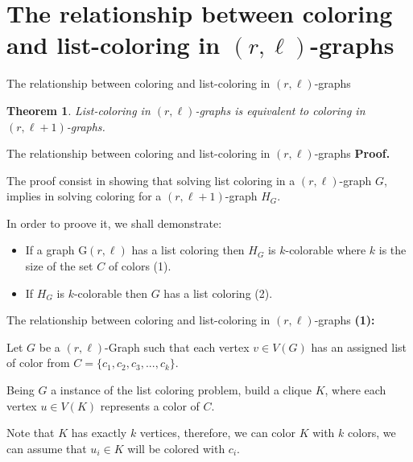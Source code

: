 \documentclass[9pt, compress]{beamer}
\newtheorem{teorema}{Theorem}
\newcommand{\?}{\textcolor{warn}{\textit{?}}}
\begin{document}
    \section{The relationship between coloring and list-coloring in $(r,\ell)$-graphs}
    \begin{frame}{The relationship between coloring and list-coloring in $(r,\ell)$-graphs}
        \begin{teorema}
          List-coloring in $(r,\ell)$-graphs is equivalent to coloring in $(r,\ell+1)$-graphs. 
        \end{teorema}
    \end{frame}
    \begin{frame}{The relationship between coloring and list-coloring in $(r,\ell)$-graphs}
        \textbf{Proof.}
        
        The proof consist in showing that solving list coloring in a $(r,\ell)$-graph $G$, implies in solving coloring for a  $(r,\ell+1)$-graph $H_G$.
        
        In order to proove it, we shall demonstrate:
          \begin{itemize}
        \item If a graph G$(r,\ell)$ has a list coloring then $H_G$ is $k$-colorable where $k$ is the size of the set $C$ of colors (1).
		\item If $H_G$ is $k$-colorable then $G$ has a list coloring (2).
      \end{itemize}
    \end{frame}
    \begin{frame}{The relationship between coloring and list-coloring in $(r,\ell)$-graphs}
      \textbf{(1):}
      
      Let $G$ be a $(r,\ell)$-Graph such that each vertex $v \in V(G)$ has an assigned list of color from $C = \{c_1,c_2,c_3,...,c_k \}$. 
      \begin{center}
        \begin{figure}
        
      \end{figure}
      \end{center}
    \end{frame}
    \begin{frame}
      Being $G$ a instance of the list coloring problem, build a clique $K$, where each vertex $u \in V(K)$ represents a color of $C$.
      \begin{center}
      \begin{figure}
        
      \end{figure}  
      \end{center}
      Note that $K$ has exactly $k$ vertices, therefore, we can color $K$ with $k$ colors, we can assume that $u_i \in K$ will be colored with $c_i$.
    \end{frame}
\end{document}
